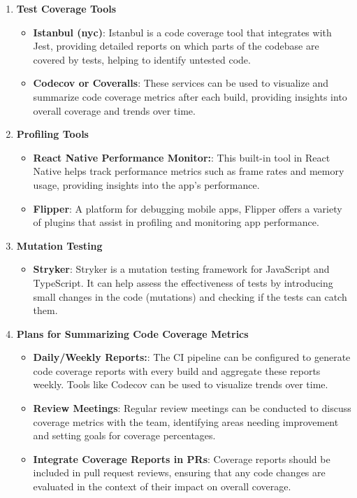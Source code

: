 \documentclass[12pt, titlepage]{article}
\begin{document}
\begin{enumerate}
	\newpage
	\item \textbf{Test Coverage Tools}
	\begin{itemize}
		\item \textbf{Istanbul (nyc)}: Istanbul is a code coverage tool that integrates with Jest, providing detailed reports on which parts of the codebase are covered by tests, helping to identify untested code.
		\item \textbf{Codecov or Coveralls}: These services can be used to visualize and summarize code coverage metrics after each build, providing insights into overall coverage and trends over time.
	\end{itemize}
	\item \textbf{Profiling Tools}
	\begin{itemize}
		\item \textbf{React Native Performance Monitor:}: This built-in tool in React Native helps track performance metrics such as frame rates and memory usage, providing insights into the app's performance.
		\item \textbf{Flipper}: A platform for debugging mobile apps, Flipper offers a variety of plugins that assist in profiling and monitoring app performance.
	\end{itemize}
	\item \textbf{Mutation Testing}
	\begin{itemize}
		\item \textbf{Stryker}: Stryker is a mutation testing framework for JavaScript and TypeScript. It can help assess the effectiveness of tests by introducing small changes in the code (mutations) and checking if the tests can catch them.
	\end{itemize}
	\item \textbf{Plans for Summarizing Code Coverage Metrics}
	\begin{itemize}
		\item \textbf{Daily/Weekly Reports:}: The CI pipeline can be configured to generate code coverage reports with every build and aggregate these reports weekly. Tools like Codecov can be used to visualize trends over time.
		\item \textbf{Review Meetings}: Regular review meetings can be conducted to discuss coverage metrics with the team, identifying areas needing improvement and setting goals for coverage percentages.
		\item \textbf{Integrate Coverage Reports in PRs}: Coverage reports should be included in pull request reviews, ensuring that any code changes are evaluated in the context of their impact on overall coverage.
	\end{itemize}
\end{enumerate}
\end{document}
